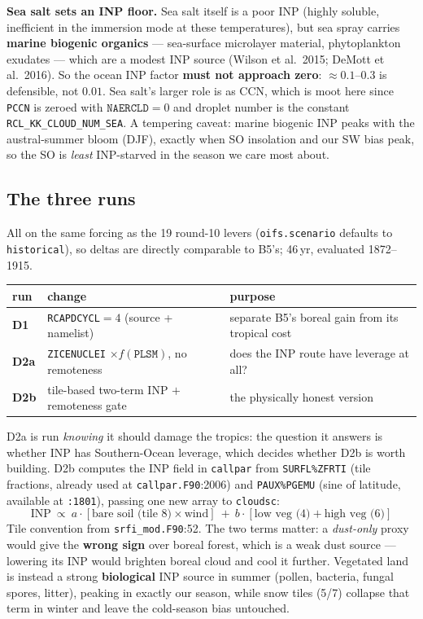 \documentclass[10pt]{article}
\begin{document}
\textbf{Sea salt sets an INP floor.} Sea salt itself is a poor INP (highly soluble, inefficient in the immersion
mode at these temperatures), but sea spray carries \textbf{marine biogenic organics} --- sea-surface microlayer
material, phytoplankton exudates --- which are a modest INP source (Wilson et al.\ 2015; DeMott et al.\ 2016).
So the ocean INP factor \textbf{must not approach zero}: $\approx0.1$--$0.3$ is defensible, not $0.01$. Sea
salt's larger role is as CCN, which is moot here since \texttt{PCCN} is zeroed with $\mathtt{NAERCLD}=0$ and
droplet number is the constant \texttt{RCL\_KK\_CLOUD\_NUM\_SEA}. A tempering caveat: marine biogenic INP peaks
with the austral-summer bloom (DJF), exactly when SO insolation and our SW bias peak, so the SO is
\emph{least} INP-starved in the season we care most about.

\subsection{The three runs}\label{sub:round11runs}
All on the same forcing as the 19 round-10 levers (\texttt{oifs.scenario} defaults to \texttt{historical}), so
deltas are directly comparable to B5's; 46\,yr, evaluated 1872--1915.

\begin{center}\footnotesize
\begin{tabular}{l l l}
\toprule
run & change & purpose \\
\midrule
\textbf{D1} & \texttt{RCAPDCYCL}$=4$ (source + namelist) & separate B5's boreal gain from its tropical cost \\
\textbf{D2a} & \texttt{ZICENUCLEI} $\times f(\mathtt{PLSM})$, no remoteness & does the INP route have leverage at all? \\
\textbf{D2b} & tile-based two-term INP $+$ remoteness gate & the physically honest version \\
\bottomrule
\end{tabular}
\end{center}

\noindent D2a is run \emph{knowing} it should damage the tropics: the question it answers is whether INP has
Southern-Ocean leverage, which decides whether D2b is worth building. D2b computes the INP field in
\texttt{callpar} from \texttt{SURFL\%ZFRTI} (tile fractions, already used at \texttt{callpar.F90}:2006) and
\texttt{PAUX\%PGEMU} (sine of latitude, available at \texttt{:1801}), passing one new array to \texttt{cloudsc}:
\[
\mathrm{INP}\ \propto\ a\cdot[\text{bare soil (tile 8)}\times\text{wind}]\ +\ b\cdot[\text{low veg (4)}+\text{high veg (6)}]
\]
Tile convention from \texttt{srfi\_mod.F90}:52. The two terms matter: a \emph{dust-only} proxy would give the
\textbf{wrong sign} over boreal forest, which is a weak dust source --- lowering its INP would brighten boreal
cloud and cool it further. Vegetated land is instead a strong \textbf{biological} INP source in summer (pollen,
bacteria, fungal spores, litter), peaking in exactly our season, while snow tiles (5/7) collapse that term in
winter and leave the cold-season bias untouched.
\end{document}
